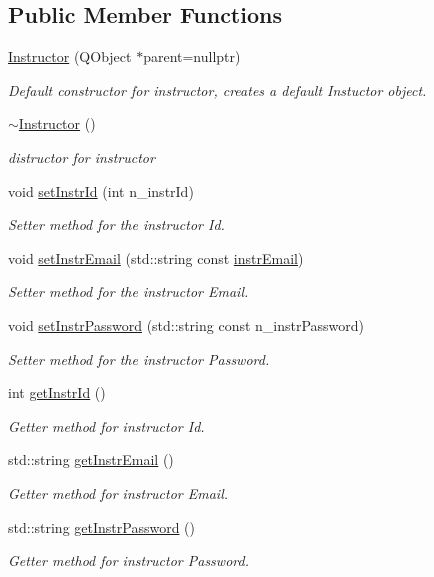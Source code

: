 \subsection*{Public Member Functions}
\begin{DoxyCompactItemize}
\item 
\hyperlink{class_instructor_a30fffbd3cab548e3b30e061712bfdbe5}{Instructor} (Q\+Object $\ast$parent=nullptr)
\begin{DoxyCompactList}\small\item\em Default constructor for instructor, creates a default Instuctor object. \end{DoxyCompactList}\item 
\hyperlink{class_instructor_aa204bec2066fabdd81a065999b01816c}{$\sim$\+Instructor} ()
\begin{DoxyCompactList}\small\item\em distructor for instructor \end{DoxyCompactList}\item 
void \hyperlink{class_instructor_a91ec2cfd9d228fbed7a6019f4e81eb5c}{set\+Instr\+Id} (int n\+\_\+instr\+Id)
\begin{DoxyCompactList}\small\item\em Setter method for the instructor Id. \end{DoxyCompactList}\item 
void \hyperlink{class_instructor_a99b99002bf23dba78dc65043c7d87c5d}{set\+Instr\+Email} (std\+::string const \hyperlink{class_instructor_aa32f70770889ea70fd9e37b176b3d35a}{instr\+Email})
\begin{DoxyCompactList}\small\item\em Setter method for the instructor Email. \end{DoxyCompactList}\item 
void \hyperlink{class_instructor_aaa6d77244009f29a2e5e1acc3d18220c}{set\+Instr\+Password} (std\+::string const n\+\_\+instr\+Password)
\begin{DoxyCompactList}\small\item\em Setter method for the instructor Password. \end{DoxyCompactList}\item 
int \hyperlink{class_instructor_a7f9c4b2b1e3da3ca45d78a9f11a68fc0}{get\+Instr\+Id} ()
\begin{DoxyCompactList}\small\item\em Getter method for instructor Id. \end{DoxyCompactList}\item 
std\+::string \hyperlink{class_instructor_a91cb628e3c244a451f121236cbb3bc20}{get\+Instr\+Email} ()
\begin{DoxyCompactList}\small\item\em Getter method for instructor Email. \end{DoxyCompactList}\item 
std\+::string \hyperlink{class_instructor_a1e57077ab77d5ca2ea2d853f7a79b279}{get\+Instr\+Password} ()
\begin{DoxyCompactList}\small\item\em Getter method for instructor Password. \end{DoxyCompactList}\end{DoxyCompactItemize}
